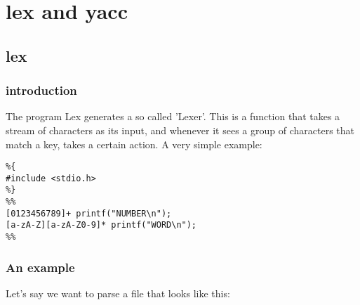 \documentclass{article}
\begin{document}
\section{lex and yacc}
\subsection{lex}
\subsubsection{introduction}
The program Lex generates a so called 'Lexer'. This is a function that takes a stream of characters as its
input, and whenever it sees a group of characters that match a key, takes a certain action. A very simple
example:
\begin{verbatim}
%{
#include <stdio.h>
%}
%%
[0123456789]+ printf("NUMBER\n");
[a-zA-Z][a-zA-Z0-9]* printf("WORD\n");
%%
\end{verbatim}

\subsubsection{An example}
Let’s say we want to parse a file that looks like this:
\end{document}
